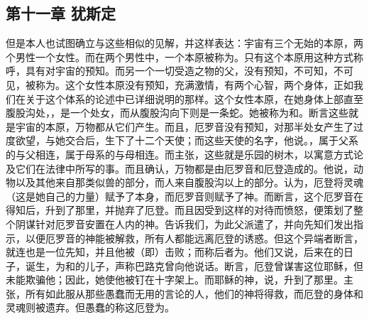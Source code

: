 
\subsection{第十一章 犹斯定}

但是本人也试图确立与这些相似的见解，并这样表达：宇宙有三个无始的本原，两个男性一个女性。而在两个男性中，一个本原被称为。只有这个本原用这种方式称呼，具有对宇宙的预知。而另一个一切受造之物的父，没有预知，不可知，不可见，被称为。这个女性本原没有预知，充满激情，有两个心智，两个身体，正如我们在关于这个体系的论述中已详细说明的那样。这个女性本原，在她身体上部直至腹股沟处，，是一个处女，而从腹股沟向下则是一条蛇。她被称为和。断言这些就是宇宙的本原，万物都从它们产生。而且，厄罗音没有预知，对那半处女产生了过度欲望，与她交合后，生下了十二个天使；而这些天使的名字，他说。，属于父系的与父相连，属于母系的与母相连。而主张，这些就是乐园的树木，以寓意方式论及它们在法律中所写的事。而且确认，万物都是由厄罗音和厄登造成的。他说，动物以及其他来自那类似兽的部分，而人来自腹股沟以上的部分。认为，厄登将灵魂（这是她自己的力量）赋予了本身，而厄罗音则赋予了神。而断言，这个厄罗音在得知后，升到了那里，并抛弃了厄登。而且因受到这样的对待而愤怒，便策划了整个阴谋针对厄罗音安置在人内的神。告诉我们，为此父派遣了，并向先知们发出指示，以便厄罗音的神能被解救，所有人都能远离厄登的诱惑。但这个异端者断言，就连也是一位先知，并且他被（即）击败；而称后者为。他们又说，后来在的日子，诞生，为和的儿子，声称巴路克曾向他说话。断言，厄登曾谋害这位耶稣，但未能欺骗他；因此，她使他被钉在十字架上。而耶稣的神，说，升到了那里。主张，所有如此服从那些愚蠢而无用的言论的人，他们的神将得救，而厄登的身体和灵魂则被遗弃。但愚蠢的称这厄登为。\par


